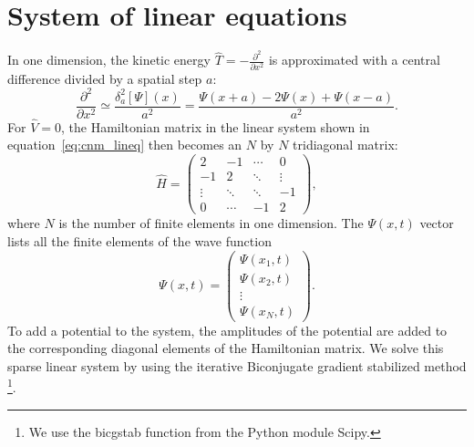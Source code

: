 
\section*{System of linear equations}
In one dimension, the kinetic energy $\hat{T}=-\frac{\partial^2}{\partial x^2}$ is approximated with a central difference divided by a spatial step $a$:
\[
    \frac{\partial^2}{\partial x^2}
    \simeq \frac{\delta_a^2[\Psi](x)}{a^2} 
    = \frac{\Psi(x+a)-2\Psi(x)+\Psi(x-a)}{a^2}.
\]For $\hat{V}=0$, the Hamiltonian matrix in the linear system shown in equation~\ref{eq:cnm_lineq} then becomes an $N$ by $N$ tridiagonal matrix:
\[
\hat{H} =
 \begin{pmatrix}
    2       & -1     & \cdots & 0       \\
    -1      & 2      & \ddots & \vdots  \\
    \vdots  & \ddots & \ddots & -1      \\
    0       & \cdots & -1     & 2
 \end{pmatrix},
 \] where $N$ is the number of finite elements in one dimension. The $\Psi(x,t)$ vector lists all the finite elements of the wave function
 \[
\Psi(x,t) =
 \begin{pmatrix}
    \Psi(x_1,t)   \\
    \Psi(x_2,t)   \\
    \vdots      \\
    \Psi(x_N,t)
 \end{pmatrix}.
 \] To add a potential to the system, the amplitudes of the potential are added to the corresponding diagonal elements of the Hamiltonian matrix. We solve this sparse linear system by using the iterative Biconjugate gradient stabilized method \footnote{We use the bicgstab function from the Python module Scipy.}.
 
